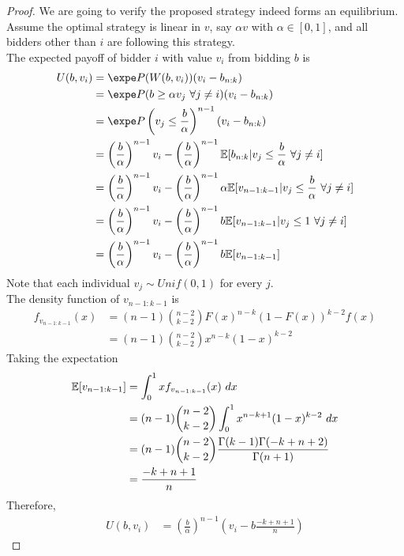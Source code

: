 \documentclass{article}
\begin{document}
	\begin{proof}
		We are going to verify the proposed strategy indeed forms an equilibrium. \\
		Assume the optimal strategy is linear in $v$, say $\alpha v$ with $\alpha \in [0, 1]$, and all bidders other than $i$ are following this strategy. \\
		The expected payoff of bidder $i$ with value $v_i$ from bidding $b$ is
		\begin{align}
			U(b, v_i) &= \expe P(W(b, v_i)) (v_i - b_{n:k}) \\
			&= \expe P(b \geq \alpha v_j\ \forall j \neq i) (v_i - b_{n:k}) \\
			&= \expe P\left(v_j \leq \frac{b}{\alpha}\right)^{n-1} (v_i - b_{n:k}) \\
			&= \left(\frac{b}{\alpha}\right)^{n-1} v_i  - \left(\frac{b}{\alpha}\right)^{n-1} \expect{b_{n:k}|v_j \leq \frac{b}{\alpha}\ \forall j \neq i} \\
			&= \left(\frac{b}{\alpha}\right)^{n-1} v_i  - \left(\frac{b}{\alpha}\right)^{n-1} \alpha \expect{v_{n-1:k-1}|v_j \leq \frac{b}{\alpha}\ \forall j \neq i} \\
			&= \left(\frac{b}{\alpha}\right)^{n-1} v_i  - \left(\frac{b}{\alpha}\right)^{n-1} b \expect{v_{n-1:k-1}|v_j \leq 1\ \forall j \neq i} \\
			&= \left(\frac{b}{\alpha}\right)^{n-1} v_i  - \left(\frac{b}{\alpha}\right)^{n-1} b \expect{v_{n-1:k-1}} \\
		\end{align}
		Note that each individual $v_j \sim Unif(0, 1)$ for every $j$.\\
		The density function of $v_{n-1:k-1}$ is
		\begin{align}
			f_{v_{n-1:k-1}}(x)
			&= (n-1) \binom{n-2}{k-2} F(x)^{n-k} (1-F(x))^{k-2} f(x) \\
			&= (n-1) \binom{n-2}{k-2} x^{n-k} (1-x)^{k-2}
		\end{align}
		Taking the expectation
		\begin{align}
			\expect{v_{n-1:k-1}} &= \int_0^1 x f_{v_{n-1:k-1}}(x)\ dx \\
			&=  (n-1) \binom{n-2}{k-2} \int_0^1 x^{n-k+1} (1-x)^{k-2}\ dx \\
			&= (n-1) \binom{n-2}{k-2} \frac{\Gamma (k-1) \Gamma (-k+n+2)}{\Gamma (n+1)} \\
			&= \frac{-k+n+1}{n}
		\end{align}
		Therefore,
		\begin{align}
			U(b, v_i) &= \left(\frac{b}{\alpha}\right)^{n-1} \left(
			v_i - b \frac{-k+n+1}{n}
			\right)
		\end{align}
		

\end{proof}
\end{document}
